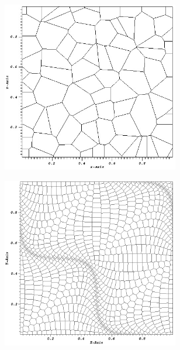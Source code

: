 \begin{figure}
\begin{subfigure}[b]{0.45\textwidth}
		\centering
		\includegraphics[width=0.85\textwidth]{figures/sec_DSA/SIP_poly_mesh.png}
		\caption{}
	\end{subfigure}
	\vfill
	\begin{subfigure}[b]{0.45\textwidth}
		\centering
		\includegraphics[width=0.85\textwidth]{figures/sec_DSA/SIP_sine_poly_mesh.png}
		\caption{}
	\end{subfigure}
	\hfill
	\begin{subfigure}[b]{0.45\textwidth}
		\centering

\end{subfigure}
\end{figure}
